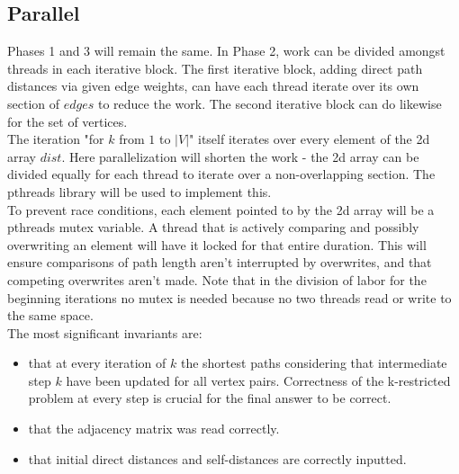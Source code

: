 \documentclass{article}
\begin{document}
\begin{adjustwidth}{-2cm}{-2cm}
\subsection{Parallel}
Phases 1 and 3 will remain the same. In Phase 2, work can be divided amongst threads in each iterative block. The first iterative block, adding direct path distances via given edge weights, can have each thread iterate over its own section of $edges$ to reduce the work. The second iterative block can do likewise for the set of vertices. \\
The iteration "for $k$ from $1$ to $\vert V \vert$" itself iterates over every element of the 2d array $dist$. Here parallelization will shorten the work - the 2d array can be divided equally for each thread to iterate over a non-overlapping section. The pthreads library will be used to implement this.\\
To prevent race conditions, each element pointed to by the 2d array will be a pthreads mutex variable. A thread that is actively comparing and possibly overwriting an element will have it locked for that entire duration. This will ensure comparisons of path length aren't interrupted by overwrites, and that competing overwrites aren't made. Note that in the division of labor for the beginning iterations no mutex is needed because no two threads read or write to the same space.\\
The most significant invariants are:
\begin{itemize}
	\item that at every iteration of $k$ the shortest paths considering that intermediate step $k$ have been updated for all vertex pairs. Correctness of the k-restricted problem at every step is crucial for the final answer to be correct.
	\item that the adjacency matrix was read correctly.
	\item that initial direct distances and self-distances are correctly inputted.
\end{itemize}


\end{adjustwidth}
\end{document}
